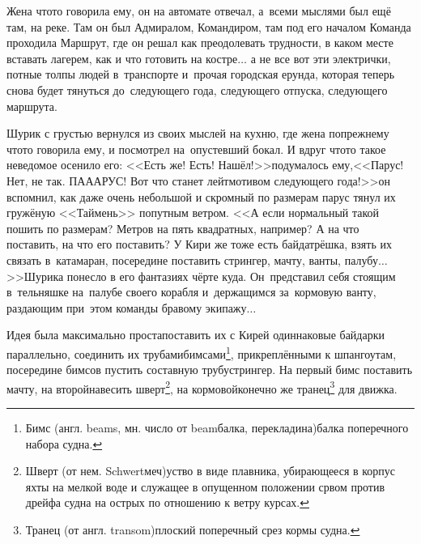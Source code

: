 {Жена что\sdash то говорила ему, он на автомате отвечал, а~всеми мыслями был ещё там, на реке. Там он был Адмиралом, Командиром, там под его началом Команда проходила Маршрут, где он решал как преодолевать трудности, в каком месте вставать лагерем, как и что готовить на костре$\ldots$ а не все вот эти электрички, потные толпы людей в~транспорте и~прочая городская ерунда, которая теперь снова будет тянуться до~следующего года, следующего отпуска, следующего маршрута.

Шурик с грустью вернулся из своих мыслей на кухню, где жена по\sdash прежнему что\sdash то говорила ему, и посмотрел на~опустевший бокал. И вдруг что\sdash то такое неведомое осенило его: <<Есть же! Есть! Нашёл!>>\mdash подумалось ему,\mdash <<Парус! Нет, не так. ПА\sdash А\sdash АРУС! Вот что станет лейтмотивом следующего года!>>\mdash он вспомнил, как даже очень небольшой и скромный по размерам парус тянул их гружёную <<Таймень>> попутным ветром. <<А если нормальный такой пошить по размерам? Метров на пять квадратных, например? А на что поставить, на что его поставить? У Кири же тоже есть байда\sdash трёшка, взять их связать в~катамаран, посередине поставить стрингер, мачту, ванты, палубу$\ldots$>>\mdash Шурика понесло в его фантазиях чёрте куда. Он~представил себя стоящим в~тельняшке на~палубе своего корабля и~держащимся за~кормовую ванту, раздающим при~этом команды бравому экипажу$\ldots$

\renewcommand*{\thefootnote}{\arabic{footnote}}
\setcounter{footnote}{0}

Идея была максимально проста\mdash поставить их с Кирей одиннаковые  байдарки параллельно, соединить их трубами\sdash бимсами\footnote{Бимс (англ. beams, мн. число от beam\mdash балка, перекладина)\mdash балка поперечного набора судна.}, прикреплёнными к шпангоутам, посередине бимсов пустить составную трубу\sdash стрингер. На первый бимс поставить мачту, на второй\mdash навесить шверт\footnote{Шверт (от нем. Schwert\mdash меч)\mdash уст\sdash во в виде плавника, убирающееся в корпус яхты на мелкой воде и служащее в опущенном положении ср\sdash вом против дрейфа судна на острых по отношению к ветру курсах.}, на кормовой\mdash конечно же транец\footnote{Транец (от англ. transom)\mdash плоский поперечный срез кормы судна.} для движка.

\renewcommand*{\thefootnote}{\arabic{footnote}}
\setcounter{footnote}{0}

}
